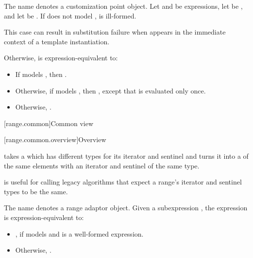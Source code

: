 \pnum
{}%
The name  denotes
a customization point object.
Let  and  be expressions,
let  be , and
let  be .
If  does not model
,
 is ill-formed.
\begin{note}
This case can result in substitution failure
when 
appears in the immediate context of a template instantiation.
\end{note}
Otherwise, 
is expression-equivalent to:
\begin{itemize}
\item
If  models ,
then .

\item
Otherwise, if  models ,
then ,
except that  is evaluated only once.

\item
Otherwise,
.
\end{itemize}

[range.common]{Common view}

[range.common.overview]{Overview}

\pnum
{} takes a  which has different types for
its iterator and sentinel and turns it into a  of the same
elements with an iterator and sentinel of the same type.

\pnum
\begin{note}
 is useful for calling legacy algorithms that expect
a range's iterator and sentinel types to be the same.
\end{note}

\pnum
{}%
The name  denotes a
range adaptor object.
Given a subexpression ,
the expression  is expression-equivalent to:
\begin{itemize}
\item {},
  if  models 
  and  is a well-formed expression.

\item Otherwise, .
\end{itemize}

